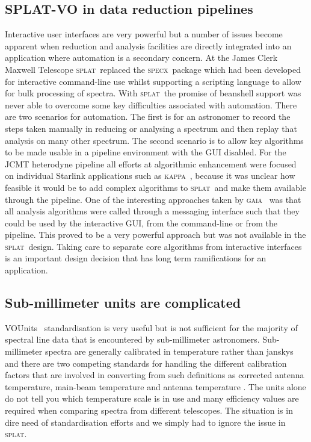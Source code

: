 \documentclass[final,authoryear,5p,times,twocolumn]{elsarticle}
\newcommand{\vounits}{VOUnits}
\newcommand{\splat}{\textsc{splat}}
\newcommand{\gaia}{\textsc{gaia}}
\newcommand{\KAPPA}{\textsc{kappa}}
\newcommand{\specx}{\textsc{specx}}
\newcommand{\ascl}[1]{\href{http://www.ascl.net/#1}{ascl:#1}}
\begin{document}
\subsection{SPLAT-VO in data reduction pipelines}

Interactive user interfaces are very powerful but a number of issues
become apparent when reduction and analysis facilities are directly
integrated into an application where automation is a secondary
concern.  At the James Clerk Maxwell Telescope \splat\ replaced the
\specx\ package \citep[][\ascl{1310.008}]{specx} which had been
developed for interactive command-line use whilst supporting a
scripting language to allow for bulk processing of spectra. With \splat\
the promise of beanshell support was never able to overcome some key
difficulties associated with automation. There are two scenarios for
automation. The first is for an astronomer to record the steps taken
manually in reducing or analysing a spectrum and then replay that
analysis on many other spectrum. The second scenario is to allow key
algorithms to be made usable in a pipeline environment with the GUI
disabled. For the JCMT heterodyne pipeline
\citep[][\ascl{1310.001}]{2008ASPC..394..565J,JennessACSISDR} all efforts at algorithmic
enhancement were focused on individual Starlink applications such as
\KAPPA\ \citep[][\ascl{1403.022}]{sun95}, because it was unclear how
feasible it would be to add complex algorithms to \splat\ and make them
available through the pipeline. One of the interesting approaches
taken by \gaia\ \citep{2009ASPC..411..575D} was that all analysis
algorithms were called through a messaging interface such that they
could be used by the interactive GUI, from the command-line or from
the pipeline. This proved to be a very powerful approach but was not
available in the \splat\ design. Taking care to separate core algorithms
from interactive interfaces is an important design decision that has
long term ramifications for an application.

\subsection{Sub-millimeter units are complicated}

\vounits\ \citep{vounits} standardisation is very useful but is not
sufficient for the majority of spectral line data that is encountered
by sub-millimeter astronomers. Sub-millimeter spectra are generally
calibrated in temperature rather than janskys and there are two
competing standards for handling the different calibration factors
that are involved in converting from such definitions as corrected
antenna temperature, main-beam temperature and antenna temperature
\citep{1981ApJ...250..341K,1989LNP...333..351D,2009tra..book.....W}. The
units alone do not tell you which temperature scale is in use and many
efficiency values are required when comparing spectra from different
telescopes. The situation is in dire need of standardisation efforts
and we simply had to ignore the issue in \splat.
\end{document}
